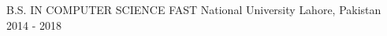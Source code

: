 

\begin{cventries}

  \cventry
    {B.S. IN COMPUTER SCIENCE} %
    {FAST National University} %
    {Lahore, Pakistan} %
	{2014 - 2018} %
	{}

\end{cventries}
